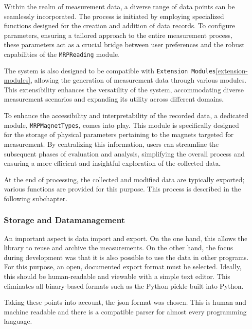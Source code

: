 Within the realm of measurement data, a diverse range of data points can
be seamlessly incorporated. The process is initiated by employing
specialized functions designed for the creation and addition of data
records. To configure parameters, ensuring a tailored approach to the
entire measurement process, these parameters act as a crucial bridge
between user preferences and the robust capabilities of the
\passthrough{\lstinline!MRPReading!} module.

The system is also designed to be compatible with
\passthrough{\lstinline!Extension Modules!}\ref{extension-modules},
allowing the generation of measurement data through various modules.
This extensibility enhances the versatility of the system, accommodating
diverse measurement scenarios and expanding its utility across different
domains.

To enhance the accessibility and interpretability of the recorded data,
a dedicated module, \passthrough{\lstinline!MRPMagnetTypes!}, comes into
play. This module is specifically designed for the storage of physical
parameters pertaining to the magnets targeted for measurement. By
centralizing this information, users can streamline the subsequent
phases of evaluation and analysis, simplifying the overall process and
ensuring a more efficient and insightful exploration of the collected
data.

At the end of processing, the collected and modified data are typically
exported; various functions are provided for this purpose. This process
is described in the following subchapter.

\hypertarget{storage-and-datamanagement}{%
\subsubsection{Storage and
Datamanagement}\label{storage-and-datamanagement}}

An important aspect is data import and export. On the one hand, this
allows the library to reuse and archive the measurements. On the other
hand, the focus during development was that it is also possible to use
the data in other programs. For this purpose, an open, documented export
format must be selected. Ideally, this should be human-readable and
viewable with a simple text editor. This eliminates all binary-based
formats such as the Python pickle built into Python.

Taking these points into account, the \gls{json} format was chosen. This
is human and machine readable and there is a compatible parser for
almost every programming language.

